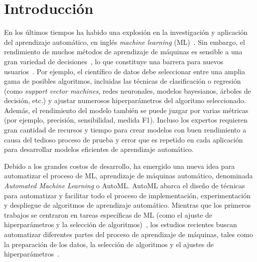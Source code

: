 \chapter*{Introducción}\label{chapter:introduction}

\qquad 

En los últimos tiempos ha habido una explosión en la investigación y aplicación del aprendizaje automático, en inglés \textit{machine learning} (ML)~\cite{hey2020machinelearning}. Sin embargo, el rendimiento de muchos métodos de aprendizaje de máquinas es sensible a una gran variedad de decisiones~\cite{dyrmishi2019decision, radwa2019automated}, lo que constituye una barrera para nuevos usuarios~\cite{crisan2021fits}. Por ejemplo, el científico de datos debe seleccionar entre una amplia gama de posibles algoritmos, incluidas las técnicas de clasificación o regresión (como \textit{support vector machines}, redes neuronales, modelos bayesianos, árboles de decisión, etc.) y ajustar numerosos hiperparámetros del algoritmo seleccionado. Además, el rendimiento del modelo también se puede juzgar por varias métricas (por ejemplo, precisión, sensibilidad, medida F1). Incluso los expertos requieren gran cantidad de recursos y tiempo para crear modelos con buen rendimiento a causa del tedioso proceso de prueba y error que es repetido en cada aplicación para desarrollar modelos eficientes de aprendizaje automático.

Debido a los grandes costos de desarrollo, ha emergido una nueva idea para automatizar el proceso de ML, aprendizaje de máquinas automático, denominada \textit{Automated Machine Learning} o AutoML. AutoML abarca el diseño de técnicas para automatizar y facilitar todo el proceso de implementación, experimentación y despliegue de algoritmos de aprendizaje automático. Mientras que los primeros trabajos se centraron en tareas específicas de ML (como el ajuste de hiperparámetros y la selección de algoritmos)~\cite{thornton2013auto}, los estudios recientes buscan automatizar diferentes partes del proceso de aprendizaje de máquinas, tales como la preparación de los datos, la selección de algoritmos y el ajustes de hiperparámetros~\cite{fuerer2015efficient, olson2019tpot, paszke2019pytorch, chen2018autostacker}.

